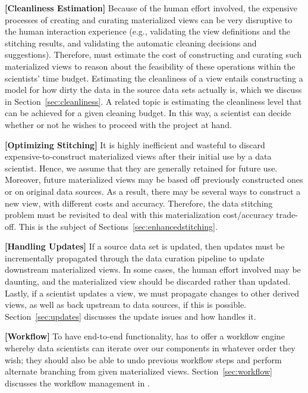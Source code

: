 {\bf[Cleanliness Estimation]}  Because of the human effort involved, the expensive processes of creating and curating materialized views  can be very disruptive to the human interaction experience (e.g., validating the view definitions and the stitching results, and validating the automatic cleaning decisions and suggestions).  Therefore, \dcv must estimate the cost of constructing and curating such materialized views  to reason about the feasibility of these operations within the scientists' time budget.  Estimating the cleanliness of a view  entails constructing a model for how dirty the data in the source data sets actually is, which we discuss in Section~\ref{sec:cleanliness}. A related topic is estimating the cleanliness level that can be achieved for a given cleaning budget.  In this way, a scientist can decide
whether or not he wishes to proceed with the project at hand.

{\bf [Optimizing Stitching]} It is highly inefficient and wasteful to  discard expensive-to-construct materialized views after their initial use by a data scientist.  Hence, we assume that they are generally retained for future use.  Moreover, future materialized views  may be based off previously constructed ones or on original data sources.  As a result, there may be several ways to construct a new view, with different  costs and accuracy. Therefore, the data stitching problem must be revisited to deal with this materialization cost/accuracy trade-off.  This is the subject of Sections~\ref{sec:enhancedstitching}.

{\bf [Handling Updates]}  If a source data set is updated, then
updates must be incrementally propagated through the data curation pipeline to
update downstream materialized views.  In some cases, the human effort involved may be
daunting, and the materialized view should be discarded rather than updated.  Lastly, if a
scientist updates a view, we must propagate changes to other derived views, as well as back upstream to data sources, if this is possible. Section~\ref{sec:updates} discusses the update issues and how \dcv handles it.

{\bf [Workflow]} To have end-to-end functionality, \dcv has to offer a workflow engine whereby data scientists can iterate over our components in whatever order they wish; they should also be able to undo previous workflow steps and perform alternate branching from given materialized views. Section~\ref{sec:workflow} discusses the  workflow management in \dcv.

